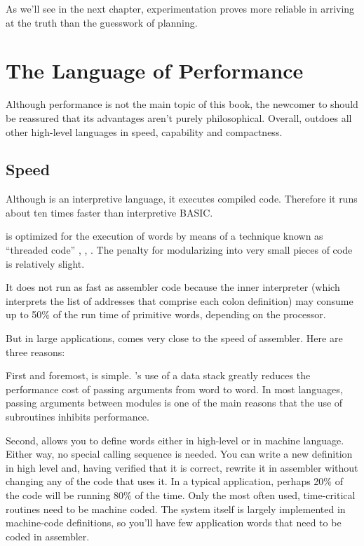As we'll see in the next chapter, experimentation proves more reliable
in arriving at the truth than the guesswork of planning.%


\section{The Language of Performance}%
%
Although performance is not the main topic of this book, the newcomer
to \Forth{} should be reassured that its advantages aren't purely
philosophical.  Overall, \Forth{} outdoes all other high-level languages
in speed, capability and compactness.


\subsection{Speed}%
%
Although \Forth{} is an interpretive language, it executes compiled code.
Therefore it runs about ten times faster than interpretive BASIC.

\Forth{} is optimized for the execution of words by means of a technique
known as ``threaded code'' \cite{bell72}, \cite{dewar},
\cite{kogge82}. The penalty for modularizing into very small pieces of
code is relatively slight.

It does not run as fast as assembler code because the inner
interpreter (which interprets the list of addresses that comprise each
colon definition) may consume up to 50\% of the run time of primitive
words, depending on the processor.

But in large applications, \Forth{} comes very close to the speed of
assembler. Here are three reasons:

First and foremost, \Forth{} is simple. \Forth{}'s use of a data stack%
%
greatly reduces the performance cost of passing arguments from word to
word. In most languages, passing arguments between modules is one of
the main reasons that the use of subroutines inhibits performance.

Second, \Forth{} allows you to define words either in high-level or in
machine language. Either way, no special calling sequence is needed.
You can write a new definition in high level and, having verified that
it is correct, rewrite it in assembler without changing any of the
code that uses it. In a typical application, perhaps 20\% of the code
will be running 80\% of the time. Only the most often used,
time-critical routines need to be machine coded. The \Forth{} system
itself is largely implemented in machine-code definitions, so you'll
have few application words that need to be coded in assembler.

